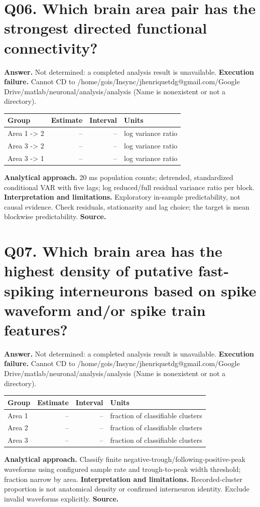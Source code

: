 \documentclass[11pt,a4paper]{article}
\begin{document}
\section*{Q06. Which brain area pair has the strongest directed functional connectivity?}
\textbf{Answer.} Not determined: a completed analysis result is unavailable.
\textbf{Execution failure.} Cannot CD to /home/gois/Insync/jhenriquetdg@gmail.com/Google Drive/matlab/neuronal/analysis/analysis (Name is nonexistent or not a directory).
\begin{tabularx}{\linewidth}{XrrX}\toprule Group & Estimate & Interval & Units \\\midrule
Area 1 -\textgreater{} 2 & -- & -- & log variance ratio \\
Area 3 -\textgreater{} 2 & -- & -- & log variance ratio \\
Area 3 -\textgreater{} 1 & -- & -- & log variance ratio \\
\bottomrule\end{tabularx}
\textbf{Analytical approach.} 20 ms population counts; detrended, standardized conditional VAR with five lags; log reduced/full residual variance ratio per block.
\textbf{Interpretation and limitations.} Exploratory in-sample predictability, not causal evidence. Check residuals, stationarity and lag choice; the target is mean blockwise predictability.
\textbf{Source.} 
\clearpage
\section*{Q07. Which brain area has the highest density of putative fast-spiking interneurons based on spike waveform and/or spike train features?}
\textbf{Answer.} Not determined: a completed analysis result is unavailable.
\textbf{Execution failure.} Cannot CD to /home/gois/Insync/jhenriquetdg@gmail.com/Google Drive/matlab/neuronal/analysis/analysis (Name is nonexistent or not a directory).
\begin{tabularx}{\linewidth}{XrrX}\toprule Group & Estimate & Interval & Units \\\midrule
Area 1 & -- & -- & fraction of classifiable clusters \\
Area 2 & -- & -- & fraction of classifiable clusters \\
Area 3 & -- & -- & fraction of classifiable clusters \\
\bottomrule\end{tabularx}
\textbf{Analytical approach.} Classify finite negative-trough/following-positive-peak waveforms using configured sample rate and trough-to-peak width threshold; fraction narrow by area.
\textbf{Interpretation and limitations.} Recorded-cluster proportion is not anatomical density or confirmed interneuron identity. Exclude invalid waveforms explicitly.
\textbf{Source.} 
\clearpage
\end{document}
